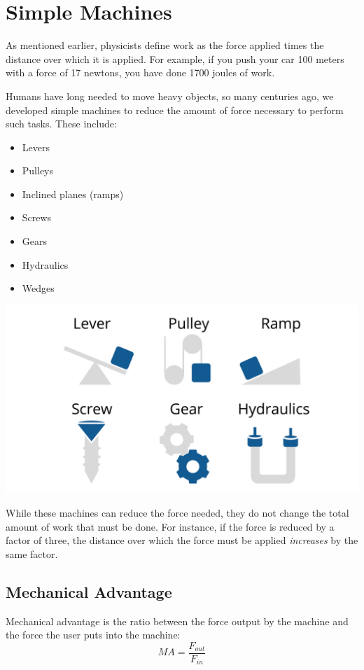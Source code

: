 \chapter{Simple Machines}

As mentioned earlier, physicists define work as the force applied times the 
distance over which it is applied. For example, if you push your car 100 meters 
with a force of 17 newtons, you have done 1700 joules of work.

Humans have long needed to move heavy objects, so many centuries ago, we 
developed simple machines to reduce the amount of force necessary to perform 
such tasks. These include:

\begin{itemize}
    \item Levers
    \item Pulleys
    \item Inclined planes (ramps)
    \item Screws
    \item Gears
    \item Hydraulics
    \item Wedges
\end{itemize}

\includegraphics[width=\textwidth]{simplemachines.png}

While these machines can reduce the force needed, they do not change the total 
amount of work that must be done. For instance, if the force is reduced by a 
factor of three, the distance over which the force must be applied \textit{increases} by 
the same factor.

\section{Mechanical Advantage}

Mechanical advantage is the ratio between the force output 
by the machine and the force the user puts into the machine:
$$ MA = \frac{F_{out}}{F_{in}}$$

